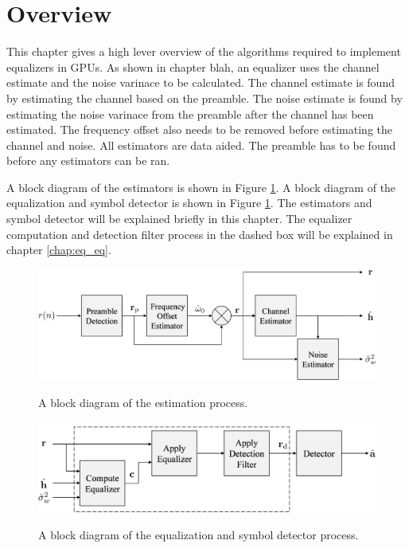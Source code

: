 \section{Overview}
This chapter gives a high lever overview of the algorithms required to implement equalizers in GPUs. 
As shown in chapter blah, an equalizer uses the channel estimate and the noise varinace to be calculated.
The channel estimate is found by estimating the channel based on the preamble.
The noise estimate is found by estimating the noise varinace from the preamble after the channel has been estimated.
The frequency offset also needs to be removed before estimating the channel and noise.
All estimators are data aided. The preamble has to be found before any estimators can be ran.


A block diagram of the estimators is shown in Figure \ref{fig:estimatorBlock}.
A block diagram of the equalization and symbol detector is shown in Figure \ref{fig:estimatorBlock}.
The estimators and symbol detector will be explained briefly in this chapter.
The equalizer computation and detection filter process in the dashed box will be explained in chapter \ref{chap:eq_eq}.
\begin{figure}
	\caption{A block diagram of the estimation process.}
	\centering\includegraphics[width=10.33in/100*55]{figures/systemOverview/estimatorBlock.pdf}
	\label{fig:estimatorBlock}
\end{figure}
\begin{figure}
	\caption{A block diagram of the equalization and symbol detector process.}
	\centering\includegraphics[width=9.35in/100*55]{figures/systemOverview/ProcessingBlock.pdf}
	\label{fig:ProcessingBlock}
\end{figure}

